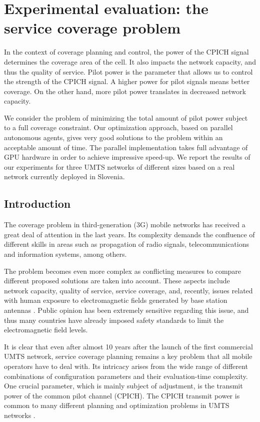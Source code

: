 
\chapter{Experimental evaluation: the service coverage problem \label{chap:Experimental-evaluation-the-service-coverage-problem}}


In the context of coverage planning and control, the power of the
CPICH signal determines the coverage area of the cell. It also impacts
the network capacity, and thus the quality of service. Pilot power
is the parameter that allows us to control the strength of the CPICH
signal. A higher power for pilot signals means better coverage. On
the other hand, more pilot power translates in decreased network capacity.

We consider the problem of minimizing the total amount of pilot power
subject to a full coverage constraint. Our optimization approach,
based on parallel autonomous agents, gives very good solutions to
the problem within an acceptable amount of time. The parallel implementation
takes full advantage of GPU hardware in order to achieve impressive
speed-up. We report the results of our experiments for three UMTS
networks of different sizes based on a real network currently deployed
in Slovenia.


\section{Introduction}

The coverage problem in third-generation (3G) mobile networks has
received a great deal of attention in the last years. Its complexity
demands the confluence of different skills in areas such as propagation
of radio signals, telecommunications and information systems, among
others.

The problem becomes even more complex as conflicting measures to compare
different proposed solutions are taken into account. These aspects
include network capacity, quality of service, service coverage, and,
recently, issues related with human exposure to electromagnetic fields
generated by base station antennas \cite{Esposito_Genetic.optimization.for.optimum.3G.network.planning:2010}.
Public opinion has been extremely sensitive regarding this issue,
and thus many countries have already imposed safety standards to limit
the electromagnetic field levels.

It is clear that even after almost 10 years after the launch of the
first commercial UMTS network, service coverage planning remains a
key problem that all mobile operators have to deal with. Its intricacy
arises from the wide range of different combinations of configuration
parameters and their evaluation-time complexity. One crucial parameter,
which is mainly subject of adjustment, is the transmit power of the
common pilot channel (CPICH). The CPICH transmit power is common to
many different planning and optimization problems in UMTS networks
\cite{Nawrocki_Understanding:2006}.

